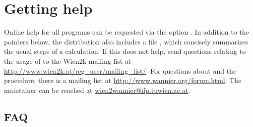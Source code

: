 






\chapter{Getting help}

Online help for all programs can be requested via the option
.  In addition to the pointers below, the \wtow distribution
also includes a file , which concisely summarizes the
usual steps of a calculation.  If this does not help, send questions
relating to the usage of \wtow to the Wien2k mailing list at
\url{http://www.wien2k.at/reg_user/mailing_list/}.  For questions
about \wannier and the \mlwf procedure, there is a mailing list at
\url{http://www.wannier.org/forum.html}.  The \wtow maintainer can be
reached at \url{wien2wannier@ifp.tuwien.ac.at}.


\section{FAQ}

